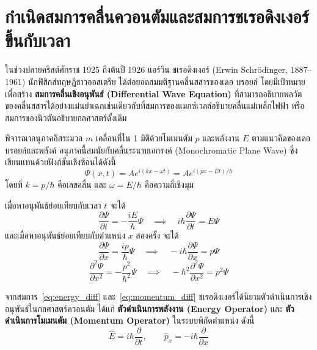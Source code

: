 \section{กำเนิดสมการคลื่นควอนตัมและสมการชเรอดิงเงอร์ขึ้นกับเวลา}

ในช่วงปลายคริสต์ศักราช 1925 ถึงต้นปี 1926 แอร์วิน ชเรอดิงเงอร์ (Erwin Schrödinger, 1887--1961) นักฟิสิกส์ทฤษฎีชาวออสเตรีย ได้ต่อยอดสมมติฐานคลื่นสสารของเดอ บรอยล์ โดยมีเป้าหมายเพื่อสร้าง \textbf{สมการคลื่นเชิงอนุพันธ์ (Differential Wave Equation)} ที่สามารถอธิบายพลวัตของคลื่นสสารได้อย่างแม่นยำเฉกเช่นเดียวกับที่สมการของแมกซ์เวลล์อธิบายคลื่นแม่เหล็กไฟฟ้า หรือสมการของนิวตันอธิบายกลศาสตร์ดั้งเดิม

พิจารณาอนุภาคอิสระมวล $m$ เคลื่อนที่ใน 1 มิติด้วยโมเมนตัม $p$ และพลังงาน $E$ ตามแนวคิดของเดอ บรอยล์และพลังค์ อนุภาคนี้สมนัยกับคลื่นระนาบเอกรงค์ (Monochromatic Plane Wave) ซึ่งเขียนแทนด้วยฟังก์ชันเชิงซ้อนได้ดังนี้
\begin{equation}
\Psi(x, t) = A e^{i(kx - \omega t)} = A e^{i(px - Et)/\hbar}
\label{eq:free_plane_wave}
\end{equation}
โดยที่ $k = p/\hbar$ คือเลขคลื่น และ $\omega = E/\hbar$ คือความถี่เชิงมุม

เมื่อหาอนุพันธ์ย่อยเทียบกับเวลา $t$ จะได้
\begin{equation}
\frac{\partial \Psi}{\partial t} = -\frac{iE}{\hbar} \Psi \quad \implies \quad i\hbar \frac{\partial \Psi}{\partial t} = E\Psi
\label{eq:energy_diff}
\end{equation}
และเมื่อหาอนุพันธ์ย่อยเทียบกับตำแหน่ง $x$ สองครั้ง จะได้
\begin{equation}
\frac{\partial \Psi}{\partial x} = \frac{ip}{\hbar} \Psi \quad \implies \quad -i\hbar \frac{\partial \Psi}{\partial x} = p\Psi
\label{eq:momentum_diff}
\end{equation}
\begin{equation}
\frac{\partial^2 \Psi}{\partial x^2} = -\frac{p^2}{\hbar^2} \Psi \quad \implies \quad -\hbar^2 \frac{\partial^2 \Psi}{\partial x^2} = p^2 \Psi
\label{eq:momentum_diff2}
\end{equation}

จากสมการ~\eqref{eq:energy_diff} และ~\eqref{eq:momentum_diff} ชเรอดิงเงอร์ได้นิยามตัวดำเนินการเชิงอนุพันธ์ในกลศาสตร์ควอนตัม ได้แก่ \textbf{ตัวดำเนินการพลังงาน (Energy Operator)} และ \textbf{ตัวดำเนินการโมเมนตัม (Momentum Operator)} ในระบบพิกัดตำแหน่ง ดังนี้
\begin{equation}
\hat{E} = i\hbar \frac{\partial}{\partial t}, \qquad \hat{p}_x = -i\hbar \frac{\partial}{\partial x}
\label{eq:quantum_operators}
\end{equation}

